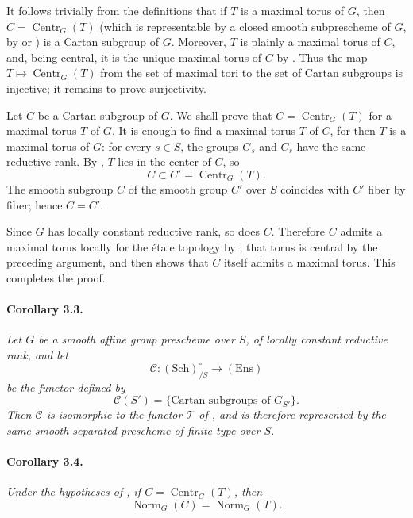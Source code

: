 It follows trivially from the definitions that if \(T\) is a maximal
torus of \(G\), then \(C=\operatorname{Centr}_G(T)\) (which is
representable by a closed smooth subprescheme of \(G\), by  or )
is a Cartan subgroup of \(G\). Moreover, \(T\) is plainly a maximal torus of \(C\), and,
being central, it is the unique maximal torus of \(C\) by .
Thus the map \(T\mapsto\operatorname{Centr}_G(T)\) from the set of
maximal tori to the set of Cartan subgroups is injective; it remains
to prove surjectivity.

Let \(C\) be a Cartan subgroup of \(G\). We shall prove that
\(C=\operatorname{Centr}_G(T)\) for a maximal torus \(T\) of \(G\).
It is enough to find a maximal torus \(T\) of \(C\), for then \(T\)
is a maximal torus of \(G\): for every \(s\in S\), the groups
\(G_s\) and \(C_s\) have the same reductive rank. By ,
\(T\) lies in the center of \(C\), so
\[
  C\subset C'=\operatorname{Centr}_G(T).
\]
The smooth subgroup \(C\) of the smooth group \(C'\) over \(S\)
coincides with \(C'\) fiber by fiber; hence \(C=C'\).

Since \(G\) has locally constant reductive rank, so does \(C\).
Therefore \(C\) admits a maximal torus locally for the étale topology
by ; that torus is central by the preceding argument, and 
then shows that \(C\) itself admits a maximal torus. This completes
the proof.

\paragraph{\textbf{Corollary 3.3.}}
\emph{Let \(G\) be a smooth affine group prescheme over \(S\), of
locally constant reductive rank, and let
\[
  \mathcal C:(\mathrm{Sch})^\circ_{/S}\longrightarrow(\mathrm{Ens})
\]
be the functor defined by
\[
  \mathcal C(S')=
  \{\text{Cartan subgroups of }G_{S'}\}.
\]
Then \(\mathcal C\) is isomorphic to the functor \(\mathcal T\) of
, and is therefore represented by the same smooth separated
prescheme of finite type over \(S\).}

\paragraph{\textbf{Corollary 3.4.}}
\emph{Under the hypotheses of , if
\(C=\operatorname{Centr}_G(T)\), then
\[
  \operatorname{Norm}_G(C)=\operatorname{Norm}_G(T).
\]}

